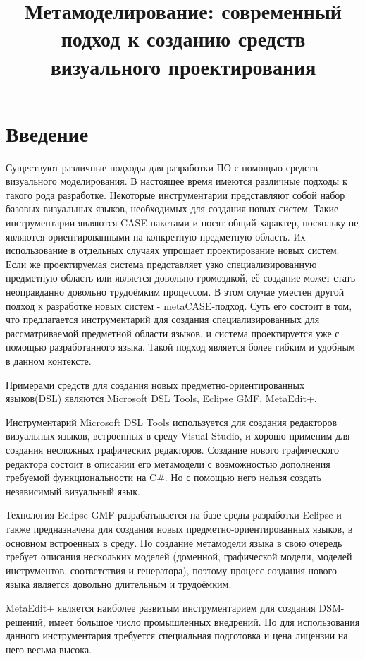 \documentclass[a5paper]{article}
\title{Метамоделирование: современный подход к созданию средств визуального проектирования}
\date{}
\begin{document}
\maketitle
\thispagestyle{empty}

\section*{Введение}
Существуют различные подходы для разработки ПО с помощью средств визуального моделирования. В настоящее время имеются различные подходы к такого рода разработке. Некоторые инструментарии представляют собой набор базовых визуальных языков, необходимых для создания новых систем. Такие инструментарии являются CASE-пакетами и носят общий характер, поскольку не являются ориентированными на конкретную предметную область. Их использование в отдельных случаях упрощает проектирование новых систем. Если же проектируемая система представляет узко специализированную предметную область или является довольно громоздкой, её создание может стать неоправданно довольно трудоёмким процессом. В этом случае уместен другой подход к разработке новых систем - metaCASE-подход. Суть его состоит в том, что предлагается инструментарий для создания специализированных для рассматриваемой предметной области языков, и система проектируется уже с помощью разработанного языка. Такой подход является более гибким и удобным в данном контексте.

Примерами средств для создания новых предметно-ориентированных языков(DSL) являются Microsoft DSL Tools, Eclipse GMF, MetaEdit+.

Инструментарий Microsoft DSL Tools используется для создания редакторов визуальных языков, встроенных в среду Visual Studio, и хорошо применим для создания несложных графических редакторов. Создание нового графического редактора состоит в описании его метамодели с возможностью дополнения требуемой функциональности на C#. Но с помощью него нельзя создать независимый визуальный язык. 

Технология Eclipse GMF разрабатывается на базе среды разработки Eclipse и также предназначена для создания новых предметно-ориентированных языков, в основном встроенных в среду. Но создание метамодели языка в свою очередь требует описания нескольких моделей (доменной, графической модели, моделей инструментов, соответствия и генератора), поэтому процесс создания нового языка является довольно длительным и трудоёмким.

MetaEdit+ является наиболее развитым инструментарием для создания DSM-решений, имеет большое число промышленных внедрений. Но для использования данного инструментария требуется специальная подготовка и цена лицензии на него весьма высока.
\end{document}
